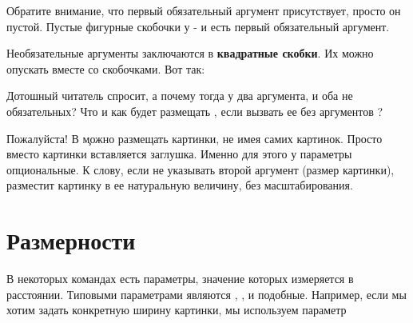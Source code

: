 {{{{Обратите внимание, что первый обязательный аргумент присутствует,
просто он пустой. Пустые фигурные скобочки у  - и
есть первый обязательный аргумент.

Необязательные аргументы заключаются в {\bf квадратные скобки}. Их можно опускать вместе со скобочками. Вот так:

\vbox{
 \hfill
\startTEX
{}
\stopTEX
\stopdescr
}

\vbox{
 \hfill
\startCODERESULT
{}
\stopCODERESULT
\stopdescr
}

Дотошный читатель спросит, а почему тогда у  два аргумента,
и оба не обязательных? Что и как будет размещать , если
вызвать ее без аргументов ?

\vbox{
 \hfill
\startTEX
\externalfigure
\stopTEX
\stopdescr
}

\vbox{
 \hfill
\startCODERESULT
\externalfigure
\stopCODERESULT
\stopdescr
}

Пожалуйста! В \c можно размещать картинки, не имея самих картинок. Просто вместо
картинки вставляется заглушка. Именно для этого у  параметры
опциональные. К слову, если не указывать второй аргумент (размер
картинки),  разместит картинку в ее натуральную величину,
без масштабирования.


\section{Размерности}

В некоторых командах есть параметры, значение которых измеряется в
расстоянии. Типовыми параметрами
являются , ,  и подобные. Например,
если мы хотим задать конкретную ширину картинки, мы используем
параметр 

\vbox{
 \hfill
\startTEX
{}
\stopTEX
\stopdescr
}

\vbox{
 \hfill
\startCODERESULT
{}
\stopCODERESULT
\stopdescr
}

}}}}
